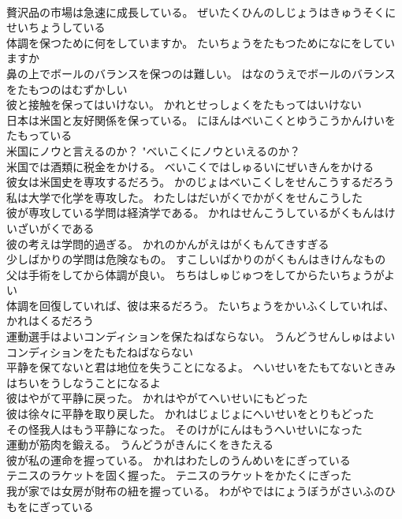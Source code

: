 \documentclass[8pt]{extreport}
\begin{document}
\begin{CJK}{UTF8}{min}
\\	贅沢品の市場は急速に成長している。	ぜいたくひんのしじょうはきゅうそくにせいちょうしている 
\\	体調を保つために何をしていますか。	たいちょうをたもつためになにをしていますか 
\\	鼻の上でボールのバランスを保つのは難しい。	はなのうえでボールのバランスをたもつのはむずかしい 
\\	彼と接触を保ってはいけない。	かれとせっしょくをたもってはいけない 
\\	日本は米国と友好関係を保っている。	にほんはべいこくとゆうこうかんけいをたもっている 
\\	米国にノウと言えるのか？	"べいこくにノウといえるのか？ 
\\	米国では酒類に税金をかける。	べいこくではしゅるいにぜいきんをかける 
\\	彼女は米国史を専攻するだろう。	かのじょはべいこくしをせんこうするだろう 
\\	私は大学で化学を専攻した。	わたしはだいがくでかがくをせんこうした 
\\	彼が専攻している学問は経済学である。	かれはせんこうしているがくもんはけいざいがくである 
\\	彼の考えは学問的過ぎる。	かれのかんがえはがくもんてきすぎる 
\\	少しばかりの学問は危険なもの。	すこしいばかりのがくもんはきけんなもの 
\\	父は手術をしてから体調が良い。	ちちはしゅじゅつをしてからたいちょうがよい 
\\	体調を回復していれば、彼は来るだろう。	たいちょうをかいふくしていれば、かれはくるだろう 
\\	運動選手はよいコンディションを保たねばならない。	うんどうせんしゅはよいコンディションをたもたねばならない 
\\	平静を保てないと君は地位を失うことになるよ。	へいせいをたもてないときみはちいをうしなうことになるよ 
\\	彼はやがて平静に戻った。	かれはやがてへいせいにもどった 
\\	彼は徐々に平静を取り戻した。	かれはじょじょにへいせいをとりもどった 
\\	その怪我人はもう平静になった。	そのけがにんはもうへいせいになった 
\\	運動が筋肉を鍛える。	うんどうがきんにくをきたえる 
\\	彼が私の運命を握っている。	かれはわたしのうんめいをにぎっている 
\\	テニスのラケットを固く握った。	テニスのラケットをかたくにぎった 
\\	我が家では女房が財布の紐を握っている。	わがやではにょうぼうがさいふのひもをにぎっている 

\end{CJK}
\end{document}
